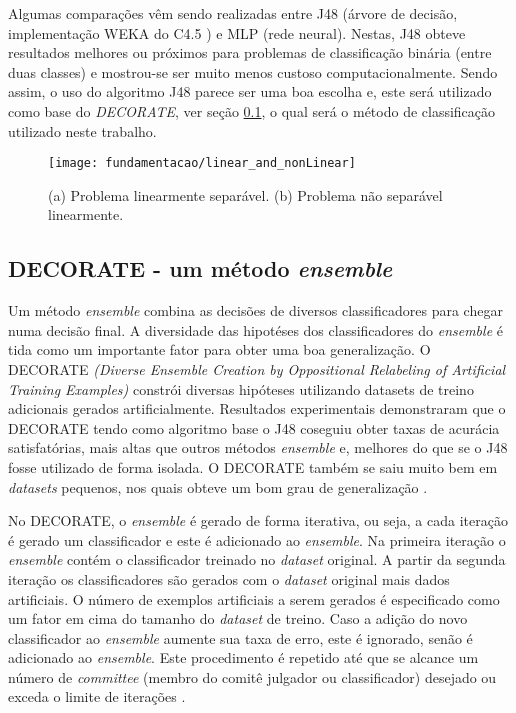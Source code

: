 Algumas comparações \cite{Firdausi:2010, Arora:2012, Karthikeyan:2013} vêm sendo realizadas entre J48 (árvore de decisão, implementação WEKA \cite{Hall:2009} do C4.5 \cite{**}) e MLP (rede neural). Nestas, J48 obteve resultados melhores ou próximos para problemas de classificação binária (entre duas classes) e mostrou-se ser muito menos custoso computacionalmente. Sendo assim, o uso do algoritmo J48 parece ser uma boa escolha e, este será utilizado como base do \textit{DECORATE}, ver seção \ref{subsec:decoration}, o qual será o método de classificação utilizado neste trabalho.

\begin{figure}[!htb] \centering 
  \centering
  \texttt{[image: fundamentacao/linear\_and\_nonLinear]} 
  \caption{(a) Problema linearmente separável. (b) Problema não separável linearmente. \cite{Elizondo:2006}} 
  \label{fig:slseparablenonseparable}
\end{figure}

\subsection{DECORATE - um método \textit{ensemble}}
\label{subsec:decoration}
Um método \textit{ensemble} combina as decisões de diversos classificadores para chegar numa decisão final. A diversidade das hipotéses dos classificadores do \textit{ensemble} é tida como um importante fator para obter uma boa generalização. O DECORATE \textit{(Diverse Ensemble Creation by Oppositional Relabeling of Artificial Training Examples)} constrói diversas hipóteses utilizando datasets de treino adicionais gerados artificialmente. Resultados experimentais demonstraram que o DECORATE tendo como algoritmo base o J48 coseguiu obter taxas de acurácia satisfatórias, mais altas que outros métodos \textit{ensemble} e, melhores do que se o J48 fosse utilizado de forma isolada. O DECORATE também se saiu muito bem em \textit{datasets} pequenos, nos quais obteve um bom grau de generalização \cite{Melville:2003, Melville:2004}.

No DECORATE, o \textit{ensemble} é gerado de forma iterativa, ou seja, a cada iteração é gerado um classificador e este é adicionado ao \textit{ensemble}. Na primeira iteração o \textit{ensemble} contém o classificador treinado no \textit{dataset} original. A partir da segunda iteração os classificadores são gerados com o \textit{dataset} original mais dados artificiais. O número de exemplos artificiais a serem gerados é especificado como um fator em cima do tamanho do \textit{dataset} de treino. Caso a adição do novo classificador ao \textit{ensemble} aumente sua taxa de erro, este é ignorado, senão é adicionado ao \textit{ensemble}. Este procedimento é repetido até que se alcance um número de \textit{committee} (membro do comitê julgador ou classificador) desejado ou exceda o limite de iterações \cite{Melville:2003}.

